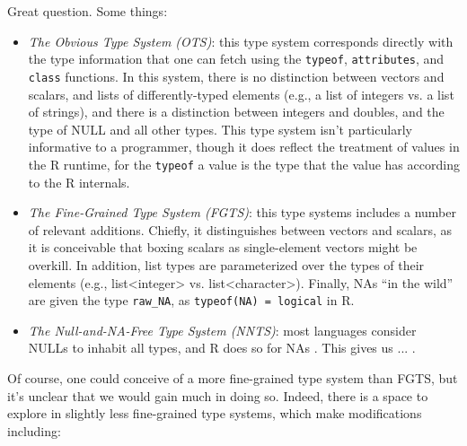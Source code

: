 \documentclass[acmsmall,10pt,review,anonymous]{acmart}\settopmatter{printfolios=true,printccs=false,printacmref=false}
\begin{document}
Great question.
Some things:

\begin{itemize}

\item {\it The Obvious Type System (OTS)}: this type system corresponds directly with the type information that one can fetch using the {\tt typeof}, {\tt attributes}, and {\tt class} functions.
In this system, there is no distinction between vectors and scalars, and lists of differently-typed elements (e.g., a list of integers vs. a list of strings), and there is a distinction between integers and doubles, and the type of NULL and all other types.
This type system isn't particularly informative to a programmer, though it does reflect the treatment of values in the R runtime, for the {\tt typeof} a value is the type that the value has according to the R internals.

\item {\it The Fine-Grained Type System (FGTS)}: this type systems includes a number of relevant additions.
Chiefly, it distinguishes between vectors and scalars, as it is conceivable that boxing scalars as single-element vectors might be overkill.
In addition, list types are parameterized over the types of their elements (e.g., list<integer> vs. list<character>).
Finally, NAs ``in the wild'' are given the type {\tt raw\_NA}, as {\tt typeof(NA) = logical} in R.

\item {\it The Null-and-NA-Free Type System (NNTS)}: most languages consider NULLs to inhabit all types, and R does so for NAs .
This gives us ... .

\end{itemize}

Of course, one could conceive of a more fine-grained type system than FGTS, but it's unclear that we would gain much in doing so.
Indeed, there is a space to explore in slightly less fine-grained type systems, which make modifications including:
\end{document}
